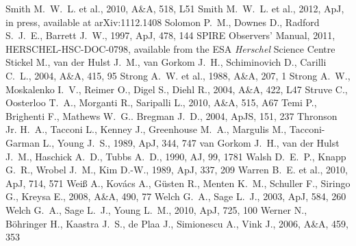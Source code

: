 \documentclass[useAMS,usenatbib,usegraphicx]{mn2e}
\newcommand{\aj}{AJ}                   %
\newcommand{\apj}{ApJ}                 %
\newcommand{\apjs}{ApJS}               %
\newcommand{\aap}{A\&A}                %
\begin{document}
\begin{thebibliography}{}
 Smith M.~W.~L. et al., 2010, \aap, 518, L51
 Smith M.~W.~L. et al., 2012, \apj, in press, available at arXiv:1112.1408
 Solomon P.~M., Downes D., Radford S.~J.~E., Barrett J.~W., 1997, \apj, 478, 144
 SPIRE Observers' Manual, 2011, HERSCHEL-HSC-DOC-0798, available from the ESA \emph{Herschel} Science Centre
 Stickel M., van der Hulst J.~M., van Gorkom J.~H., Schiminovich D., Carilli C.~L., 2004, \aap, 415, 95
 Strong A.~W. et al., 1988, \aap, 207, 1
 Strong A.~W., Moskalenko I.~V., Reimer O., Digel S., Diehl R., 2004, \aap, 422, L47
 Struve C., Oosterloo T.~A., Morganti R., Saripalli L., 2010, \aap, 515, A67
 Temi P., Brighenti F., Mathews W.~G.. Bregman J.~D., 2004, \apjs, 151, 237
 Thronson Jr. H.~A., Tacconi L., Kenney J., Greenhouse M.~A., Margulis M., Tacconi-Garman L., Young J.~S., 1989, \apj, 344, 747
 van Gorkom J.~H., van der Hulst J.~M., Haschick A.~D., Tubbs A.~D., 1990, \aj, 99, 1781
 Walsh D.~E.~P., Knapp G.~R., Wrobel J.~M., Kim D.-W., 1989, \apj, 337, 209
 Warren B.~E. et al., 2010, \apj, 714, 571
 Wei{\ss} A., Kov{\'a}cs A., G{\"u}sten R., Menten K.~M., Schuller F., Siringo G., Kreysa E., 2008, \aap, 490, 77
 Welch G.~A., Sage L.~J., 2003, \apj, 584, 260
 Welch G.~A., Sage L.~J., Young L.~M., 2010, \apj, 725, 100
 Werner N., B{\"o}hringer H., Kaastra J.~S., de Plaa J., Simionescu A., Vink J., 2006, \aap, 459, 353

\end{thebibliography}
\end{document}
